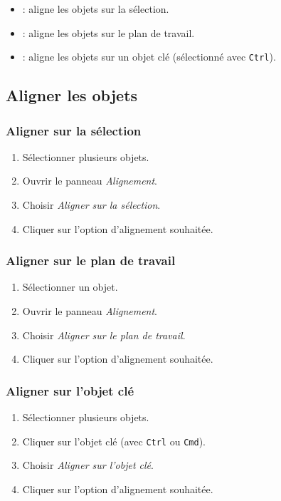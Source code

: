 \begin{itemize}
    \item {} : aligne les objets sur la sélection.
    \item {} : aligne les objets sur le plan de travail.
    \item {} : aligne les objets sur un objet clé (sélectionné avec \texttt{Ctrl}).
\end{itemize}

\subsection{Aligner les objets}

\subsubsection{Aligner sur la sélection}

\begin{enumerate}
    \item Sélectionner plusieurs objets.
    \item Ouvrir le panneau \emph{Alignement}.
    \item Choisir \emph{Aligner sur la sélection}.
    \item Cliquer sur l'option d'alignement souhaitée.
\end{enumerate}

\subsubsection{Aligner sur le plan de travail}

\begin{enumerate}
    \item Sélectionner un objet.
    \item Ouvrir le panneau \emph{Alignement}.
    \item Choisir \emph{Aligner sur le plan de travail}.
    \item Cliquer sur l'option d'alignement souhaitée.
\end{enumerate}

\subsubsection{Aligner sur l'objet clé}

\begin{enumerate}
    \item Sélectionner plusieurs objets.
    \item Cliquer sur l'objet clé (avec \texttt{Ctrl} ou \texttt{Cmd}).
    \item Choisir \emph{Aligner sur l'objet clé}.
    \item Cliquer sur l'option d'alignement souhaitée.
\end{enumerate}

